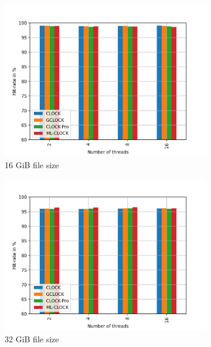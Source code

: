 \documentclass[
	12pt,
	a4paper,
	abstract,
	bibliography=totoc,
	chapterprefix,
	headings=openright,
	numbers=endperiod,
	parskip=half,
	twoside,
]{scrreprt}
\begin{document}
\begin{figure}[H]
	\centering
	\begin{subfigure}{0.4\textwidth}
		\includegraphics[width=\textwidth]{multi_16_gb_rw_90to10_normal.jpg}		
		\caption{16 GiB file size}
		\label{fig:rw_90to10  zipf}
	\end{subfigure}
	\hfill
	\begin{subfigure}{0.4\textwidth}
		\includegraphics[width=\textwidth]{multi_32_gb_rw_90to10_normal.jpg}		
		\caption{32 GiB file size}
		\label{fig:rw_90to10  normal}
	\end{subfigure}
	\hfill
	\begin{subfigure}{0.4\textwidth}

\end{subfigure}
\end{figure}
\end{document}
